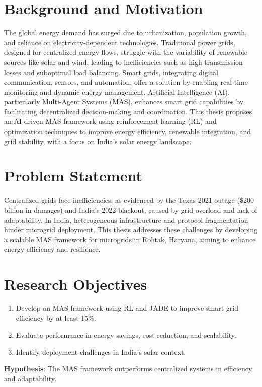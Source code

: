 \documentclass[12pt, a4paper, oneside]{book}
\begin{document}
\section{Background and Motivation}
The global energy demand has surged due to urbanization, population growth, and reliance on electricity-dependent technologies. Traditional power grids, designed for centralized energy flows, struggle with the variability of renewable sources like solar and wind, leading to inefficiencies such as high transmission losses and suboptimal load balancing. Smart grids, integrating digital communication, sensors, and automation, offer a solution by enabling real-time monitoring and dynamic energy management. Artificial Intelligence (AI), particularly Multi-Agent Systems (MAS), enhances smart grid capabilities by facilitating decentralized decision-making and coordination. This thesis proposes an AI-driven MAS framework using reinforcement learning (RL) and optimization techniques to improve energy efficiency, renewable integration, and grid stability, with a focus on India’s solar energy landscape.

\section{Problem Statement}
Centralized grids face inefficiencies, as evidenced by the Texas 2021 outage (\$200 billion in damages) and India’s 2022 blackout, caused by grid overload and lack of adaptability. In India, heterogeneous infrastructure and protocol fragmentation hinder microgrid deployment. This thesis addresses these challenges by developing a scalable MAS framework for microgrids in Rohtak, Haryana, aiming to enhance energy efficiency and resilience.

\section{Research Objectives}
\begin{enumerate}
    \item Develop an MAS framework using RL and JADE to improve smart grid efficiency by at least 15\%.
    \item Evaluate performance in energy savings, cost reduction, and scalability.
    \item Identify deployment challenges in India’s solar context.
\end{enumerate}
\textbf{Hypothesis}: The MAS framework outperforms centralized systems in efficiency and adaptability.
\end{document}
